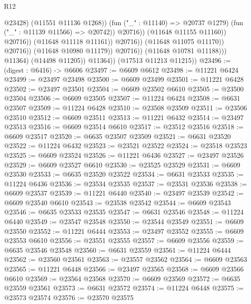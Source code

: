 \begin{lexlean}{R12}
\begin{coremodule}
                                                    @23428)
                                                  (@11551 @11136 @1268))
                                                (fun ("_" : @11140) => @20737 @1279)
                                                (fun ("_" : @11139 @11566) => @20742))
                                              @20716))
                                          (@11648 @11155 @11160))
                                        @20716))
                                    (@11648 @11118 @11161))
                                  @20716))
                              (@11648 @11075 @11170))
                            @20716))
                        (@11648 @10980 @11179))
                      @20716))
                  (@11648 @10781 @11188)))
              @11364)
            (@14498 @11205))
          @11364))
      (@17513 @11213 @11215))
@23496 := (digest : @6416) -> @6606
@23497 := @6609 @6612
@23498 := @11221 @6424
@23499 := @23497 @23498
@23500 := @6609 @23499
@23501 := @11221 @6428
@23502 := @23497 @23501
@23504 := @6609 @23502 @6610
@23505 := @23500 @23504
@23506 := @6609 @23505
@23507 := @11224 @6424
@23508 := @6631 @23507
@23509 := @11224 @6428
@23510 := @23508 @23509
@23511 := @23506 @23510
@23512 := @6609 @23511
@23513 := @11221 @6432
@23514 := @23497 @23513
@23516 := @6609 @23514 @6610
@23517 := @23512 @23516
@23518 := @6609 @23517
@23520 := @6635 @23507 @23509
@23521 := @6631 @23520
@23522 := @11224 @6432
@23523 := @23521 @23522
@23524 := @23518 @23523
@23525 := @6609 @23524
@23526 := @11221 @6436
@23527 := @23497 @23526
@23529 := @6609 @23527 @6610
@23530 := @23525 @23529
@23531 := @6609 @23530
@23533 := @6635 @23520 @23522
@23534 := @6631 @23533
@23535 := @11224 @6436
@23536 := @23534 @23535
@23537 := @23531 @23536
@23538 := @6609 @23537
@23539 := @11221 @6440
@23540 := @23497 @23539
@23542 := @6609 @23540 @6610
@23543 := @23538 @23542
@23544 := @6609 @23543
@23546 := @6635 @23533 @23535
@23547 := @6631 @23546
@23548 := @11224 @6440
@23549 := @23547 @23548
@23550 := @23544 @23549
@23551 := @6609 @23550
@23552 := @11221 @6444
@23553 := @23497 @23552
@23555 := @6609 @23553 @6610
@23556 := @23551 @23555
@23557 := @6609 @23556
@23559 := @6635 @23546 @23548
@23560 := @6631 @23559
@23561 := @11224 @6444
@23562 := @23560 @23561
@23563 := @23557 @23562
@23564 := @6609 @23563
@23565 := @11221 @6448
@23566 := @23497 @23565
@23568 := @6609 @23566 @6610
@23569 := @23564 @23568
@23570 := @6609 @23569
@23572 := @6635 @23559 @23561
@23573 := @6631 @23572
@23574 := @11224 @6448
@23575 := @23573 @23574
@23576 := @23570 @23575

\end{coremodule}
\end{lexlean}
